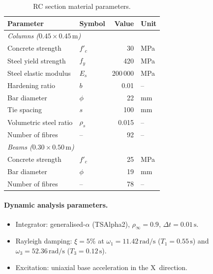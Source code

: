 \begin{table}[htb]
\centering
\caption{RC section material parameters.}
\label{tab:rc_materials}
\begin{tabular}{llrl}
\hline
Parameter & Symbol & Value & Unit \\
\hline
\multicolumn{4}{l}{\emph{Columns ($0.45 \times 0.45\,\text{m}$)}} \\
Concrete strength      & $f'_c$  &  30       & MPa \\
Steel yield strength   & $f_y$   & 420       & MPa \\
Steel elastic modulus  & $E_s$   & 200\,000  & MPa \\
Hardening ratio        & $b$     &   0.01    & -- \\
Bar diameter           & $\phi$  &  22       & mm \\
Tie spacing            & $s$     & 100       & mm \\
Volumetric steel ratio & $\rho_s$& 0.015     & -- \\
Number of fibres       & --      &  92       & -- \\
\hline
\multicolumn{4}{l}{\emph{Beams ($0.30 \times 0.50\,\text{m}$)}} \\
Concrete strength      & $f'_c$  &  25       & MPa \\
Bar diameter           & $\phi$  &  19       & mm \\
Number of fibres       & --      &  78       & -- \\
\hline
\end{tabular}
\end{table}

\paragraph{Dynamic analysis parameters.}
\begin{itemize}
  \item Integrator: generalised-$\alpha$ (TSAlpha2),
        $\rho_\infty = 0.9$, $\Delta t = 0.01\,\text{s}$.
  \item Rayleigh damping: $\xi = 5\%$ at $\omega_1 = 11.42\,\text{rad/s}$
        ($T_1 = 0.55\,\text{s}$) and
        $\omega_3 = 52.36\,\text{rad/s}$ ($T_3 = 0.12\,\text{s}$).
  \item Excitation: uniaxial base acceleration in the X~direction.
\end{itemize}


